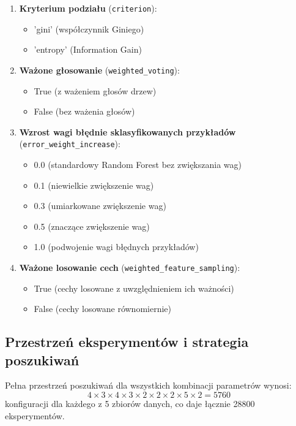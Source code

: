 \documentclass[11pt,a4paper]{article}
\begin{document}
\begin{enumerate}
    \item \textbf{Kryterium podziału} (\texttt{criterion}):
    \begin{itemize}
        \item 'gini' (współczynnik Giniego)
        \item 'entropy' (Information Gain)
    \end{itemize}

    \item \textbf{Ważone głosowanie} (\texttt{weighted\_voting}):
    \begin{itemize}
        \item True (z ważeniem głosów drzew)
        \item False (bez ważenia głosów)
    \end{itemize}

    \item \textbf{Wzrost wagi błędnie sklasyfikowanych przykładów} (\texttt{error\_weight\_increase}):
    \begin{itemize}
        \item 0.0 (standardowy Random Forest bez zwiększania wag)
        \item 0.1 (niewielkie zwiększenie wag)
        \item 0.3 (umiarkowane zwiększenie wag)
        \item 0.5 (znaczące zwiększenie wag)
        \item 1.0 (podwojenie wagi błędnych przykładów)
    \end{itemize}

    \item \textbf{Ważone losowanie cech} (\texttt{weighted\_feature\_sampling}):
    \begin{itemize}
        \item True (cechy losowane z uwzględnieniem ich ważności)
        \item False (cechy losowane równomiernie)
    \end{itemize}
\end{enumerate}

\subsection{Przestrzeń eksperymentów i strategia poszukiwań}

Pełna przestrzeń poszukiwań dla wszystkich kombinacji parametrów wynosi:
\begin{equation}
4 \times 3 \times 4 \times 3 \times 2 \times 2 \times 2 \times 5 \times 2 = 5760
\end{equation}
konfiguracji dla każdego z 5 zbiorów danych, co daje łącznie 28800 eksperymentów.
\end{document}

